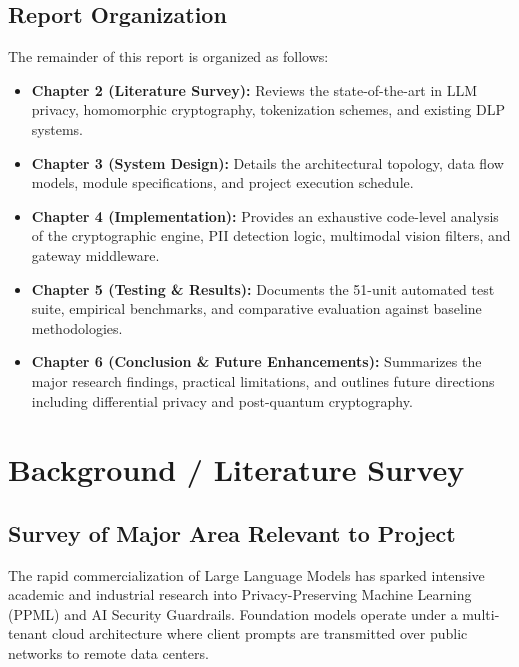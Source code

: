 \documentclass[12pt,a4paper,oneside]{report}
\numberwithin{equation}{chapter}
\begin{document}
\section{Report Organization}
The remainder of this report is organized as follows:
\begin{itemize}[leftmargin=*]
    \item \textbf{Chapter 2 (Literature Survey):} Reviews the state-of-the-art in LLM privacy, homomorphic cryptography, tokenization schemes, and existing DLP systems.
    \item \textbf{Chapter 3 (System Design):} Details the architectural topology, data flow models, module specifications, and project execution schedule.
    \item \textbf{Chapter 4 (Implementation):} Provides an exhaustive code-level analysis of the cryptographic engine, PII detection logic, multimodal vision filters, and gateway middleware.
    \item \textbf{Chapter 5 (Testing \& Results):} Documents the 51-unit automated test suite, empirical benchmarks, and comparative evaluation against baseline methodologies.
    \item \textbf{Chapter 6 (Conclusion \& Future Enhancements):} Summarizes the major research findings, practical limitations, and outlines future directions including differential privacy and post-quantum cryptography.
\end{itemize}

\chapter{Background / Literature Survey}

\section{Survey of Major Area Relevant to Project}
The rapid commercialization of Large Language Models has sparked intensive academic and industrial research into Privacy-Preserving Machine Learning (PPML) and AI Security Guardrails. Foundation models operate under a multi-tenant cloud architecture where client prompts are transmitted over public networks to remote data centers. 
\end{document}
